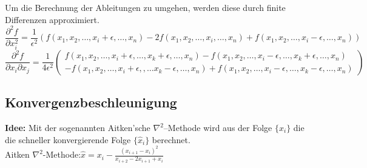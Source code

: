   Um die Berechnung der Ableitungen zu umgehen, werden diese durch finite Differenzen approximiert. 
  $$\frac{\partial^2 f}{\partial x_i^2} = \frac{1}{\epsilon^2} 
  \left( f(x_1, x_2, \ldots, x_i+\epsilon, \ldots, x_n) - 2 f(x_1, x_2, \ldots, x_i, \ldots, x_n) + f(x_1, x_2, \ldots, x_i-\epsilon, \ldots, x_n) \right)$$
  $$\frac{\partial^2 f}{\partial x_i \partial x_j} = \frac{1}{4 \epsilon^2} \begin{pmatrix}
    f(x_1, x_2, \ldots, x_i+\epsilon, \ldots, x_k+\epsilon, \ldots, x_n) - f(x_1, x_2, \ldots, x_i-\epsilon, \ldots, x_k+\epsilon, \ldots, x_n)\\
    -f(x_1, x_2, \ldots, x_i+\epsilon, , \ldots x_k-\epsilon, \ldots, x_n) + f(x_1, x_2, \ldots, x_i-\epsilon, \ldots, x_k-\epsilon, \ldots, x_n)
  \end{pmatrix}$$
 
 \subsection{Konvergenzbeschleunigung}
 \textbf{Idee:} Mit der sogenannten Aitken'sche   $\nabla^2$–Methode wird aus der Folge $\{x_i\}$ die die schneller konvergierende Folge $\{\hat{x}_i\}$ berechnet.\\
 
 Aitken $\nabla^2$-Methode:\quad $\boxed{\hat{x}=x_i-\frac{(x_{i+1}-x_i)^2}{x_{i+2}-2x_{i+1}+x_{i}}}$
 
 
 

  